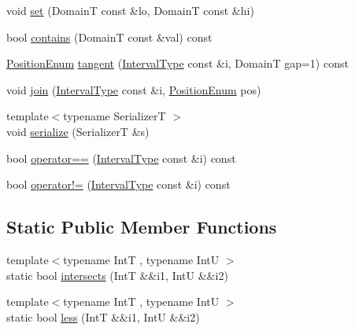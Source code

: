 \begin{DoxyCompactItemize}
\item 
void \hyperlink{structvt_1_1term_1_1interval_1_1_interval_ad35081ddb8a26d02d9e1bbae722da2ba}{set} (DomainT const \&lo, DomainT const \&hi)
\item 
bool \hyperlink{structvt_1_1term_1_1interval_1_1_interval_a7464cff4f0697f02604868fcf60a8132}{contains} (DomainT const \&val) const
\item 
\hyperlink{structvt_1_1term_1_1interval_1_1_interval_adfdde0c1b12f536189432b168f6df6b3}{Position\+Enum} \hyperlink{structvt_1_1term_1_1interval_1_1_interval_a5558f4e833a84bed506f4fdc3a386071}{tangent} (\hyperlink{structvt_1_1term_1_1interval_1_1_interval_a183b53c7344a9aa51c026dfe71b57ad4}{Interval\+Type} const \&i, DomainT gap=1) const
\item 
void \hyperlink{structvt_1_1term_1_1interval_1_1_interval_ab39108ee4b0837f74bcbc8fe456dedac}{join} (\hyperlink{structvt_1_1term_1_1interval_1_1_interval_a183b53c7344a9aa51c026dfe71b57ad4}{Interval\+Type} const \&i, \hyperlink{structvt_1_1term_1_1interval_1_1_interval_adfdde0c1b12f536189432b168f6df6b3}{Position\+Enum} pos)
\item 
{\footnotesize template$<$typename SerializerT $>$ }\\void \hyperlink{structvt_1_1term_1_1interval_1_1_interval_ae176079522ba7c58e69a55d51f80a4c9}{serialize} (SerializerT \&s)
\item 
bool \hyperlink{structvt_1_1term_1_1interval_1_1_interval_a16520378af9e1732749f52b8016980b4}{operator==} (\hyperlink{structvt_1_1term_1_1interval_1_1_interval_a183b53c7344a9aa51c026dfe71b57ad4}{Interval\+Type} const \&i) const
\item 
bool \hyperlink{structvt_1_1term_1_1interval_1_1_interval_afedba25db2f425af176d3d2c9219a8fe}{operator!=} (\hyperlink{structvt_1_1term_1_1interval_1_1_interval_a183b53c7344a9aa51c026dfe71b57ad4}{Interval\+Type} const \&i) const
\end{DoxyCompactItemize}
\subsection*{Static Public Member Functions}
\begin{DoxyCompactItemize}
\item 
{\footnotesize template$<$typename IntT , typename IntU $>$ }\\static bool \hyperlink{structvt_1_1term_1_1interval_1_1_interval_aa9ce87dd0605710869be8d9c12547d2c}{intersects} (IntT \&\&i1, IntU \&\&i2)
\item 
{\footnotesize template$<$typename IntT , typename IntU $>$ }\\static bool \hyperlink{structvt_1_1term_1_1interval_1_1_interval_aeceb02f8e69baada4cc1d47bdefc851f}{less} (IntT \&\&i1, IntU \&\&i2)
\end{DoxyCompactItemize}
